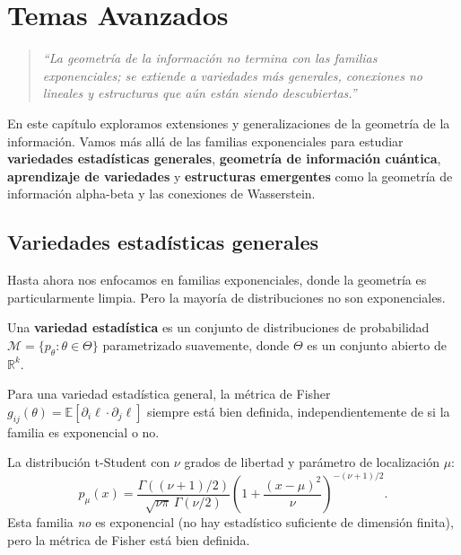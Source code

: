 
\chapter{Temas Avanzados}

\begin{quotation}
	\itshape
	``La geometría de la información no termina con las familias exponenciales; se extiende a variedades más generales, conexiones no lineales y estructuras que aún están siendo descubiertas.''
\end{quotation}

En este capítulo exploramos extensiones y generalizaciones de la geometría de la información.  Vamos más allá de las familias exponenciales para estudiar \textbf{variedades estadísticas generales}, \textbf{geometría de información cuántica}, \textbf{aprendizaje de variedades} y \textbf{estructuras emergentes} como la geometría de información alpha-beta y las conexiones de Wasserstein.

\section{Variedades estadísticas generales}

Hasta ahora nos enfocamos en familias exponenciales, donde la geometría es particularmente limpia.  Pero la mayoría de distribuciones no son exponenciales.

\begin{definition}
	Una \textbf{variedad estadística} es un conjunto de distribuciones de probabilidad $\mathcal{M} = \{p_\theta : \theta \in \Theta\}$ parametrizado suavemente, donde $\Theta$ es un conjunto abierto de $\mathbb{R}^k$.
\end{definition}

\begin{proposition}
	Para una variedad estadística general, la métrica de Fisher $g_{ij}(\theta) = \mathbb{E}[\partial_i \ell \cdot \partial_j \ell]$ siempre está bien definida, independientemente de si la familia es exponencial o no.
\end{proposition}

\begin{example}
	La distribución t-Student con $\nu$ grados de libertad y parámetro de localización $\mu$:
	\[
	p_\mu(x) = \frac{\Gamma((\nu+1)/2)}{\sqrt{\nu\pi}\,\Gamma(\nu/2)} \left(1 + \frac{(x-\mu)^2}{\nu}\right)^{-(\nu+1)/2}.
	\]
	Esta familia \emph{no} es exponencial (no hay estadístico suficiente de dimensión finita), pero la métrica de Fisher está bien definida.
\end{example}

